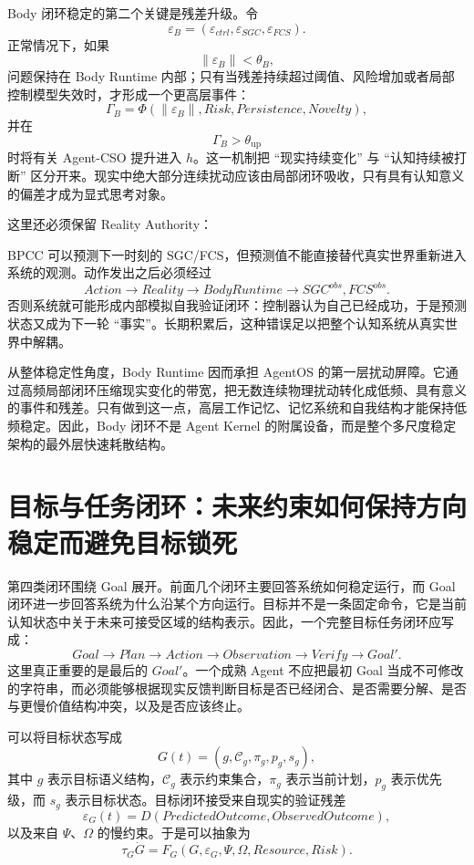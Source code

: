 Body 闭环稳定的第二个关键是残差升级。令
\[
\varepsilon_B
=
\left(
\varepsilon_{ctrl},
\varepsilon_{SGC},
\varepsilon_{FCS}
\right).
\]
正常情况下，如果
\[
\|\varepsilon_B\|<\theta_B,
\]
问题保持在 Body Runtime 内部；只有当残差持续超过阈值、风险增加或者局部控制模型失效时，才形成一个更高层事件：
\[
\Gamma_B
=
\Phi
\left(
\|\varepsilon_B\|,
Risk,
Persistence,
Novelty
\right),
\]
并在
\[
\Gamma_B>\theta_{\mathrm{up}}
\]
时将有关 Agent-CSO 提升进入 $h$。这一机制把 ``现实持续变化'' 与 ``认知持续被打断'' 区分开来。现实中绝大部分连续扰动应该由局部闭环吸收，只有具有认知意义的偏差才成为显式思考对象。

这里还必须保留 Reality Authority：
\begin{statementbox}
\centering
{}
\end{statementbox}
BPCC 可以预测下一时刻的 SGC/FCS，但预测值不能直接替代真实世界重新进入系统的观测。动作发出之后必须经过
\[
Action
\rightarrow
Reality
\rightarrow
BodyRuntime
\rightarrow
SGC^{obs},FCS^{obs}.
\]
否则系统就可能形成内部模拟自我验证闭环：控制器认为自己已经成功，于是预测状态又成为下一轮 ``事实''。长期积累后，这种错误足以把整个认知系统从真实世界中解耦。

从整体稳定性角度，Body Runtime 因而承担 AgentOS 的第一层扰动屏障。它通过高频局部闭环压缩现实变化的带宽，把无数连续物理扰动转化成低频、具有意义的事件和残差。只有做到这一点，高层工作记忆、记忆系统和自我结构才能保持低频稳定。因此，Body 闭环不是 Agent Kernel 的附属设备，而是整个多尺度稳定架构的最外层快速耗散结构。

\section{目标与任务闭环：未来约束如何保持方向稳定而避免目标锁死}

第四类闭环围绕 Goal 展开。前面几个闭环主要回答系统如何稳定运行，而 Goal 闭环进一步回答系统为什么沿某个方向运行。目标并不是一条固定命令，它是当前认知状态中关于未来可接受区域的结构表示。因此，一个完整目标任务闭环应写成：
\[
Goal
\rightarrow
Plan
\rightarrow
Action
\rightarrow
Observation
\rightarrow
Verify
\rightarrow
Goal'.
\]
这里真正重要的是最后的 $Goal'$。一个成熟 Agent 不应把最初 Goal 当成不可修改的字符串，而必须能够根据现实反馈判断目标是否已经闭合、是否需要分解、是否与更慢价值结构冲突，以及是否应该终止。

可以将目标状态写成
\[
G(t)
=
\left(
g,
\mathcal C_g,
\pi_g,
p_g,
s_g
\right),
\]
其中 $g$ 表示目标语义结构，$\mathcal C_g$ 表示约束集合，$\pi_g$ 表示当前计划，$p_g$ 表示优先级，而 $s_g$ 表示目标状态。目标闭环接受来自现实的验证残差
\[
\varepsilon_G(t)
=
D
\left(
PredictedOutcome,
ObservedOutcome
\right),
\]
以及来自 $\Psi$、$\Omega$ 的慢约束。于是可以抽象为
\[
\tau_G\dot G
=
F_G
\left(
G,
\varepsilon_G,
\Psi,
\Omega,
Resource,
Risk
\right).
\]

